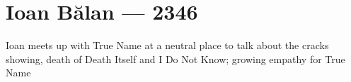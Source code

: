 \hypertarget{ioan-bux103lan-2346}{%
\chapter{Ioan Bălan — 2346}\label{ioan-bux103lan-2346}}

Ioan meets up with True Name at a neutral place to talk about the cracks showing, death of Death Itself and I Do Not Know; growing empathy for True Name

